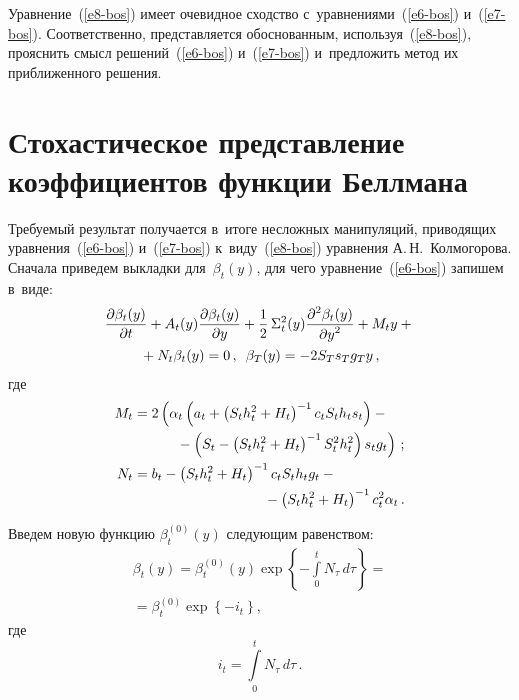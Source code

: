 \begin{multicols}{2}
     Уравнение~(\ref{e8-bos}) имеет очевидное сходство 
     с~уравнениями~(\ref{e6-bos}) и~(\ref{e7-bos}). Соответственно, представляется 
обоснованным, используя~(\ref{e8-bos}), прояснить смысл решений~(\ref{e6-bos}) 
и~(\ref{e7-bos}) и~предложить метод их приближенного решения.
     
\section{Стохастическое представление коэффициентов функции 
Беллмана}

     Требуемый результат получается в~итоге несложных манипуляций, 
приводящих уравнения~(\ref{e6-bos}) и~(\ref{e7-bos}) к~виду~(\ref{e8-bos}) 
уравнения А.\,Н.~Колмогорова. Сначала приведем выкладки 
для~$\beta_t(y)$, для чего уравнение~(\ref{e6-bos}) запишем в~виде:
     \begin{multline}
     \displaystyle\frac{\displaystyle \partial\beta_t(y)\mathstrut}{\displaystyle \partial t\mathstrut} +A_t(y)\displaystyle\frac{\displaystyle \partial \beta_t(y)\mathstrut}{\displaystyle \partial y\mathstrut} 
+\displaystyle\frac{\displaystyle 1\mathstrut}{\displaystyle 2\mathstrut}\,\Sigma_t^2(y)\displaystyle\frac{\displaystyle \partial^2\beta_t(y)\mathstrut}{\displaystyle \partial y^2\mathstrut} +M_t y +{}\\
{}+ N_t 
\beta_t(y)=0\,,\enskip 
\beta_T(y)=-2S_T s_T g_T y\,,
     \label{e9-bos}
     \end{multline}
где 
\begin{align*}
M_t&=2\left(\alpha_t \left( a_t+\left( S_t h_t^2+H_t\right)^{-1} c_t S_t h_t s_t\right)
 -{}\right.\\
&\hspace*{10mm}\left. {}-
\left( S_t -\left( S_t h_t^2+H_t\right)^{-1} S_t^2 h_t^2\right) s_t g_t\right)\,;
\\
N_t&=b_t-\left( S_t h_t^2 +H_t\right)^{-1} c_t S_t h_t g_t -{}\\
&\hspace*{33mm}{}-\left( S_t h_t^2 
+H_t\right)^{-1} c_t^2 \alpha_t\,.
\end{align*}
     
     Введем новую функцию $\beta_t^{(0)}(y)$ следующим равенством:
     \begin{multline}
     \beta_t(y)=\beta_t^{(0)}(y)\exp 
     \left\{ -\!\int\limits_0^t\! N_\tau\,d\tau\right\}={}\\
     {}=
     \beta_t^{(0)} \exp \left\{ -i_t\right\},
          \label{e10-bos}
     \end{multline}
     где
     $$
     i_t=\int\limits_0^t N_\tau\,d\tau\,.
     $$


\end{multicols}
